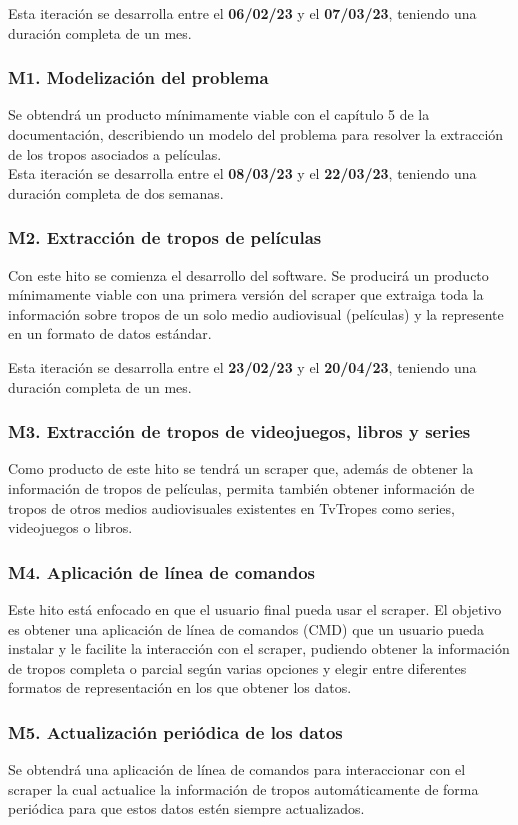 Esta iteración se desarrolla entre el \textbf{06/02/23} y el \textbf{07/03/23},
teniendo una duración completa de un mes.
\subsubsection{M1. Modelización del problema}
Se obtendrá un producto mínimamente viable con el capítulo 5 de la
documentación, describiendo un modelo del problema para resolver la extracción
de los tropos asociados a películas.\\

Esta iteración se desarrolla entre el \textbf{08/03/23} y el \textbf{22/03/23},
teniendo una duración completa de dos semanas.
\subsubsection{M2. Extracción de tropos de películas}
Con este hito se comienza el desarrollo del software. Se producirá un producto
mínimamente viable con una primera versión del scraper que extraiga toda la
información sobre tropos de un solo medio audiovisual (películas) y la
represente en un formato de datos estándar.

Esta iteración se desarrolla entre el \textbf{23/02/23} y el \textbf{20/04/23},
teniendo una duración completa de un mes.

\subsubsection{M3. Extracción de tropos de videojuegos, libros y series}
Como producto de este hito se tendrá un scraper que, además de obtener la
información de tropos de películas, permita también obtener información de
tropos de otros medios audiovisuales existentes en TvTropes como series,
videojuegos o libros.

\subsubsection{M4. Aplicación de línea de comandos}
Este hito está enfocado en que el usuario final pueda usar el scraper. El
objetivo es obtener una aplicación de línea de comandos (CMD) que un usuario
pueda instalar y le facilite la interacción con el scraper, pudiendo obtener la
información de tropos completa o parcial según varias opciones y elegir entre
diferentes formatos de representación en los que obtener los datos.

\subsubsection{M5. Actualización periódica de los datos}
Se obtendrá una aplicación de línea de comandos para interaccionar con el
scraper la cual actualice la información de tropos automáticamente de forma
periódica para que estos datos estén siempre actualizados. 

